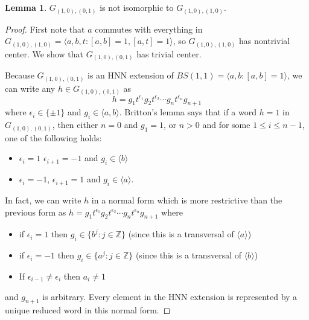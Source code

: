 \documentclass[10pt]{article}
\def\integers{{\mathbb{Z}}}
\theoremstyle{definition}
\newtheorem{lemma}{Lemma}
\begin{document}
\begin{lemma}
    $G_{(1,0),(0,1)}$ is not isomorphic to $G_{(1,0),(1,0)}$. 
\end{lemma}
\begin{proof}
First note that $a$ commutes with everything in $G_{(1,0),(1,0)} = \langle a,b,t: [a,b]=1, [a,t]=1\rangle$, so $G_{(1,0),(1,0)}$ has nontrivial center. We show that $G_{(1,0),(0,1)}$ has trivial center. 

Because $G_{(1,0),(0,1)}$ is an HNN extension of $BS(1,1)=\langle a,b :[a,b]=1\rangle$, we can write any $h\in G_{(1,0),(0,1)}$ as $$h=g_1 t^{\epsilon_1} g_2 t^{\epsilon_2}  \cdots g_n t^{\epsilon_n} g_{n+1}$$ where $\epsilon_i\in \{\pm 1\}$ and $g_i\in \langle a,b\rangle$. Britton's lemma says that if a word $h=1$ in $G_{(1,0),(0,1)}$, then either $n=0$ and $g_1=1$, or $n>0$ and for some $1\leq i \leq n-1$, one of the following holds:
\begin{itemize}
    \item $\epsilon_i = 1$ $\epsilon_{i+1}=-1$ and $g_i\in \langle b \rangle$
    \item $\epsilon_i=-1$, $\epsilon_{i+1}=1$ and $g_i \in \langle a \rangle$.
\end{itemize}

In fact, we can write $h$ in a normal form which is more restrictive than the previous form as $h=g_1 t^{\epsilon_1} g_2 t^{\epsilon_2} \cdots g_n t^{\epsilon_n} g_{n+1}$ where 
\begin{itemize}
    \item if $\epsilon_i =1$ then $g_i \in \{b^j:j\in \integers\}$ (since this is a transversal of $\langle a \rangle$)
    \item if $\epsilon_i=-1$ then $g_i \in \{a^j:j\in \integers\}$ (since this is a transversal of $\langle b \rangle$)
    \item If $\epsilon_{i-1}\ne \epsilon_i$ then $a_i \ne 1$
\end{itemize} and $g_{n+1}$ is arbitrary. Every element in the HNN extension is represented by a unique reduced word in this normal form. 


\end{proof}
\end{document}
